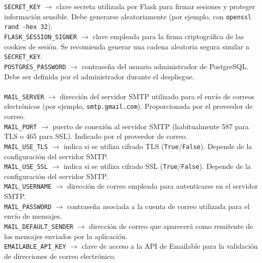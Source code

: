 \begin{tcolorbox}[
	colback=yellow!8,
	colframe=orange!60!black,
	title=secret.env,
	fonttitle=\bfseries,
	breakable
]
	{\footnotesize
		\noindent
		\texttt{SECRET\_KEY} $\rightarrow$ clave secreta utilizada por Flask para firmar sesiones y proteger información sensible. Debe generarse aleatoriamente (por ejemplo, con \texttt{openssl rand -hex 32}).\\
		
		\texttt{FLASK\_SESSION\_SIGNER} $\rightarrow$ clave empleada para la firma criptográfica de las cookies de sesión. Se recomienda generar una cadena aleatoria segura similar a \texttt{SECRET\_KEY}.\\
		
		\texttt{POSTGRES\_PASSWORD} $\rightarrow$ contraseña del usuario administrador de PostgreSQL. Debe ser definida por el administrador durante el despliegue.\\
		\\
		
		\texttt{MAIL\_SERVER} $\rightarrow$ dirección del servidor SMTP utilizado para el envío de correos electrónicos (por ejemplo, \texttt{smtp.gmail.com}). Proporcionada por el proveedor de correo.\\
		
		\texttt{MAIL\_PORT} $\rightarrow$ puerto de conexión al servidor SMTP (habitualmente 587 para TLS o 465 para SSL). Indicado por el proveedor de correo.\\
		
		\texttt{MAIL\_USE\_TLS} $\rightarrow$ indica si se utiliza cifrado TLS (\texttt{True}/\texttt{False}). Depende de la configuración del servidor SMTP.\\
		
		\texttt{MAIL\_USE\_SSL} $\rightarrow$ indica si se utiliza cifrado SSL (\texttt{True}/\texttt{False}). Depende de la configuración del servidor SMTP.\\
		
		\texttt{MAIL\_USERNAME} $\rightarrow$ dirección de correo empleada para autenticarse en el servidor SMTP.\\
		
		\texttt{MAIL\_PASSWORD} $\rightarrow$ contraseña asociada a la cuenta de correo utilizada para el envío de mensajes.\\
		
		\texttt{MAIL\_DEFAULT\_SENDER} $\rightarrow$ dirección de correo que aparecerá como remitente de los mensajes enviados por la aplicación.\\
		
		\texttt{EMAILABLE\_API\_KEY} $\rightarrow$ clave de acceso a la API de Emailable para la validación de direcciones de correo electrónico.
	}
\end{tcolorbox}

